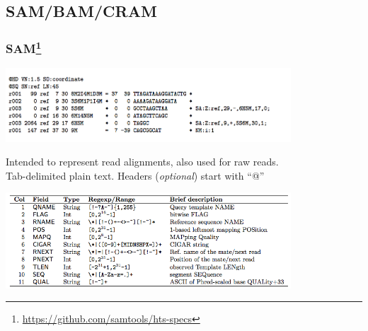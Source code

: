 \subsection{SAM/BAM/CRAM}

\begin{frame}[fragile]
  \frametitle{SAM\footnote{\tiny{\href{http://samtools.github.io/hts-specs/SAMv1.pdf}{https://github.com/samtools/hts-specs}}}}
  \begin{center}
    \includegraphics[width=0.8\textwidth]{images/sam_format}
  \end{center}  
  Intended to represent read alignments, also used for raw reads. \\
  Tab-delimited plain text. Headers (\textit{optional}) start with ``@'' \\
  \begin{center}
    \includegraphics[width=0.8\textwidth]{images/sam_columns}
  \end{center}  
\end{frame}

